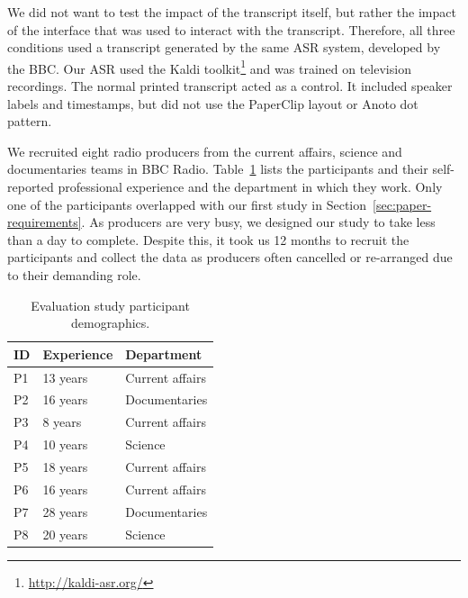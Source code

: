 We did not want to test the impact of the transcript itself, but rather the impact of the interface that was used to
interact with the transcript. Therefore, all three conditions used a transcript generated by the same ASR system,
developed by the BBC. Our ASR used the Kaldi toolkit\footnote{\url{http://kaldi-asr.org/}} and was trained on
television recordings.  The normal printed transcript acted as a control. It included speaker labels and timestamps,
but did not use the PaperClip layout or Anoto dot pattern.

We recruited eight radio producers from the current affairs, science and documentaries teams in BBC Radio.
Table~\ref{tab:participants} lists the participants and their self-reported professional experience and the department in
which they work.
Only one of the
participants overlapped with our first study in Section~\ref{sec:paper-requirements}.  As producers are very busy, we
designed our study to take less than a day to complete. Despite this, it took us 12 months to recruit the participants
and collect the data as producers often cancelled or re-arranged due to their demanding role.

\begin{table}[h]
  \centering
  \begin{tabular}{l l l}
      \hline
      \textbf{ID} & \textbf{Experience} & \textbf{Department} \\ %
      \hline
      P1 & 13 years & Current affairs \\%
      P2 & 16 years & Documentaries   \\%
      P3 & 8 years & Current affairs \\%
      P4 & 10 years & Science         \\%
      P5 & 18 years & Current affairs \\%
      P6 & 16 years & Current affairs \\%
      P7 & 28 years & Documentaries   \\%
      P8 & 20 years & Science         \\%
      \hline
  \end{tabular}
  \caption{Evaluation study participant demographics.}
  \label{tab:participants}
\end{table}








